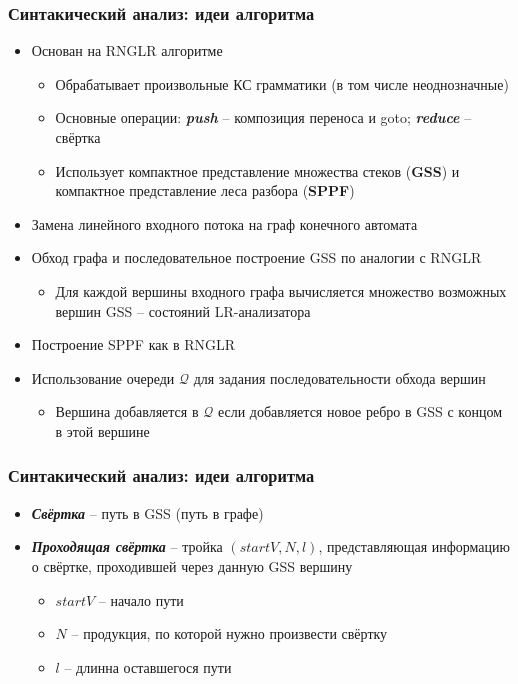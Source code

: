 \documentclass{beamer}
\begin{document}
\begin{frame}
    \transwipe[direction=90]
    \frametitle{Синтакический анализ: идеи алгоритма}
    \begin{itemize}         
        \item Основан на RNGLR алгоритме
        \begin{itemize}         
           \item Обрабатывает произвольные КС грамматики (в том числе неоднозначные)
           \item Основные операции: {\bfseries{\textit{push}}} -- композиция переноса и goto; {\bfseries{\textit{reduce}}} -- свёртка
           \item Использует компактное представление множества стеков ({\bfseries GSS}) и компактное представление леса разбора ({\bfseries SPPF})
        \end{itemize}
        \item Замена линейного входного потока на граф конечного автомата
        \item Обход графа и последовательное построение GSS по аналогии с RNGLR
            \begin{itemize}         
                \item Для каждой вершины входного графа вычисляется множество возможных вершин GSS -- состояний LR-анализатора
            \end{itemize}
        \item Построение SPPF как в RNGLR
        \item Использование очереди $\mathcal Q$ для задания последовательности обхода вершин
            \begin{itemize}         
                \item Вершина добавляется в $\mathcal Q$ если добавляется новое ребро в GSS с концом в этой вершине
            \end{itemize}
    \end{itemize}
\end{frame}

\begin{frame}
    \transwipe[direction=90]
    \frametitle{Синтакический анализ: идеи алгоритма}
    \begin{itemize}         
         \item {\bfseries{\textit{Свёртка}}} -- путь в GSS (путь в графе)
         \item {\bfseries{\textit{Проходящая свёртка}}} -- тройка $(startV, N, l)$, представляющая информацию о свёртке, проходившей через данную GSS вершину
         \begin{itemize}         
                \item $startV$ -- начало пути
        \item $N$ -- продукция, по которой нужно произвести свёртку
        \item $l$ -- длинна оставшегося пути
         \end{itemize}
    \end{itemize}
\end{frame}
\end{document}
